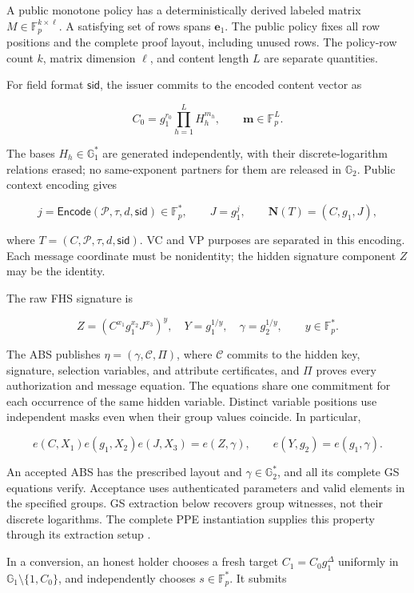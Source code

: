 \documentclass[11pt]{article}
\begin{document}
A public monotone policy has a deterministically derived labeled matrix \(M\in\mathbb F_p^{k\times\ell}\). A satisfying set of rows spans \(\boldsymbol e_1\). The public policy fixes all row positions and the complete proof layout, including unused rows. The policy-row count \(k\), matrix dimension \(\ell\), and content length \(L\) are separate quantities.

For field format \(\mathsf{sid}\), the issuer commits to the encoded content vector as

\[
C_0=g_1^{r_0}\prod_{h=1}^{L}H_h^{m_h},\qquad
\boldsymbol m\in\mathbb F_p^L.
\tag{1}
\]

The bases \(H_h\in\mathbb G_1^*\) are generated independently, with their discrete-logarithm relations erased; no same-exponent partners for them are released in \(\mathbb G_2\). Public context encoding gives

\[
j=\mathsf{Encode}(\mathcal P,\tau,d,\mathsf{sid})\in\mathbb F_p^*,
\qquad J=g_1^j,
\qquad \boldsymbol N(T)=(C,g_1,J),
\tag{2}
\]

where \(T=(C,\mathcal P,\tau,d,\mathsf{sid})\). VC and VP purposes are separated in this encoding. Each message coordinate must be nonidentity; the hidden signature component \(Z\) may be the identity.

The raw FHS signature is

\[
Z=(C^{x_1}g_1^{x_2}J^{x_3})^y,\quad
Y=g_1^{1/y},\quad \gamma=g_2^{1/y},\qquad y\in\mathbb F_p^*.
\tag{3}
\]

The ABS publishes \(\eta=(\gamma,\mathcal C,\Pi)\), where \(\mathcal C\) commits to the hidden key, signature, selection variables, and attribute certificates, and \(\Pi\) proves every authorization and message equation. The equations share one commitment for each occurrence of the same hidden variable. Distinct variable positions use independent masks even when their group values coincide. In particular,

\[
e(C,X_1)e(g_1,X_2)e(J,X_3)=e(Z,\gamma),\qquad
e(Y,g_2)=e(g_1,\gamma).
\tag{4}
\]

An accepted ABS has the prescribed layout and \(\gamma\in\mathbb G_2^*\), and all its complete GS equations verify. Acceptance uses authenticated parameters and valid elements in the specified groups. GS extraction below recovers group witnesses, not their discrete logarithms. The complete PPE instantiation supplies this property through its extraction setup \cite{Groth2013}.

In a conversion, an honest holder chooses a fresh target \(C_1=C_0g_1^\Delta\) uniformly in \(\mathbb G_1\setminus\{1,C_0\}\), and independently chooses \(s\in\mathbb F_p^*\). It submits
\end{document}
